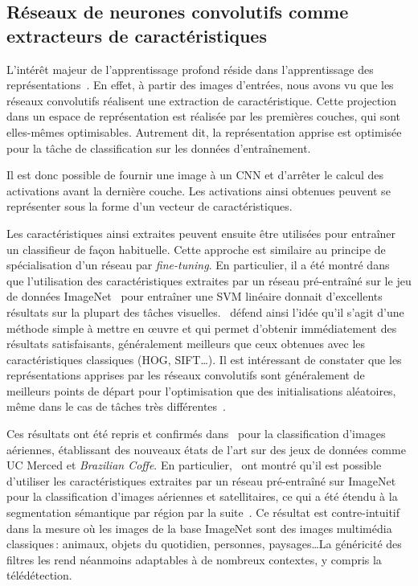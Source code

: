 \subsection{Réseaux de neurones convolutifs comme extracteurs de caractéristiques}

L'intérêt majeur de l'apprentissage profond réside dans l'apprentissage des représentations~\cite{bengio_representation_2013,goodfellow_deep_2016}. En effet, à partir des images d'entrées, nous avons vu que les réseaux convolutifs réalisent une extraction de caractéristique. Cette projection dans un espace de représentation est réalisée par les premières couches, qui sont elles-mêmes optimisables. Autrement dit, la représentation apprise est optimisée pour la tâche de classification sur les données d'entraînement.

Il est donc possible de fournir une image à un \gls{CNN} et d'arrêter le calcul des activations avant la dernière couche. Les activations ainsi obtenues peuvent se représenter sous la forme d'un vecteur de caractéristiques.

Les caractéristiques ainsi extraites peuvent ensuite être utilisées pour entraîner un classifieur de façon habituelle. Cette approche est similaire au principe de spécialisation d'un réseau par \emph{fine-tuning}. En particulier, il a été montré dans~\cite{razavian_cnn_2014} que l'utilisation des caractéristiques extraites par un réseau pré-entraîné sur le jeu de données ImageNet~\cite{deng_imagenet_2009} pour entraîner une \gls{SVM} linéaire donnait d'excellents résultats sur la plupart des tâches visuelles.~\cite{razavian_cnn_2014} défend ainsi l'idée qu'il s'agit d'une méthode simple à mettre en \oe{}uvre et qui permet d'obtenir immédiatement des résultats satisfaisants, généralement meilleurs que ceux obtenues avec les caractéristiques classiques (\gls{HOG}, \gls{SIFT}\dots). Il est intéressant de constater que les représentations apprises par les réseaux convolutifs sont généralement de meilleurs points de départ pour l'optimisation que des initialisations aléatoires, même dans le cas de tâches très différentes~\cite{yosinski_how_2014}.

Ces résultats ont été repris et confirmés dans~\cite{penatti_deep_2015,marmanis_deep_2016,lagrange_benchmarking_2015} pour la classification d'images aériennes, établissant des nouveaux états de l'art sur des jeux de données comme UC Merced et \emph{Brazilian Coffe}. En particulier,~\cite{marmanis_deep_2016,penatti_deep_2015} ont montré  qu'il est possible d'utiliser les caractéristiques extraites par un réseau pré-entraîné sur ImageNet pour la classification d'images aériennes et satellitaires, ce qui a été étendu à la segmentation sémantique par région par la suite~\cite{lagrange_benchmarking_2015}. Ce résultat est contre-intuitif dans la mesure où les images de la base ImageNet sont des images multimédia classiques\,: animaux, objets du quotidien, personnes, paysages\dots La généricité des filtres les rend néanmoins adaptables à de nombreux contextes, y compris la télédétection.

